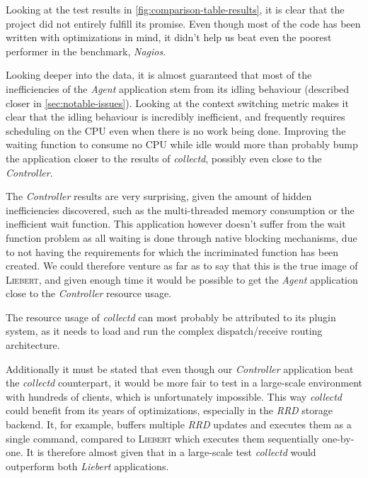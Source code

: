         Looking at the test results in \autoref{fig:comparison-table-results}, it is clear that the project did not entirely fulfill its promise. Even though most of the code has been written with optimizations in mind, it didn't help us beat even the poorest performer in the benchmark, \textit{Nagios}.
        
        Looking deeper into the data, it is almost guaranteed that most of the inefficiencies of the \textit{Agent} application stem from its idling behaviour (described closer in \autoref{sec:notable-issues}). Looking at the context switching metric makes it clear that the idling behaviour is incredibly inefficient, and frequently requires scheduling on the CPU even when there is no work being done. Improving the waiting function to consume no CPU while idle would more than probably bump the application closer to the results of \textit{collectd}, possibly even close to the \textit{Controller}.
        
        The \textit{Controller} results are very surprising, given the amount of hidden inefficiencies discovered, such as the multi-threaded memory consumption or the inefficient wait function. This application however doesn't suffer from the wait function problem as all waiting is done through native blocking mechanisms, due to not having the requirements for which the incriminated function has been created. We could therefore venture as far as to say that this is the true image of \textsc{Liebert}, and given enough time it would be possible to get the \textit{Agent} application close to the \textit{Controller} resource usage.
        
        The resource usage of \textit{collectd} can most probably be attributed to its plugin system, as it needs to load and run the complex dispatch/receive routing architecture.
        
        Additionally it must be stated that even though our \textit{Controller} application beat the \textit{collectd} counterpart, it would be more fair to test in a large-scale environment with hundreds of clients, which is unfortunately impossible. This way \textit{collectd} could benefit from its years of optimizations, especially in the \textit{RRD} storage backend. It, for example, buffers multiple \textit{RRD} updates and executes them as a single command, compared to \textsc{Liebert} which executes them sequentially one-by-one. It is therefore almost given that in a large-scale test \textit{collectd} would outperform both \textit{Liebert} applications.